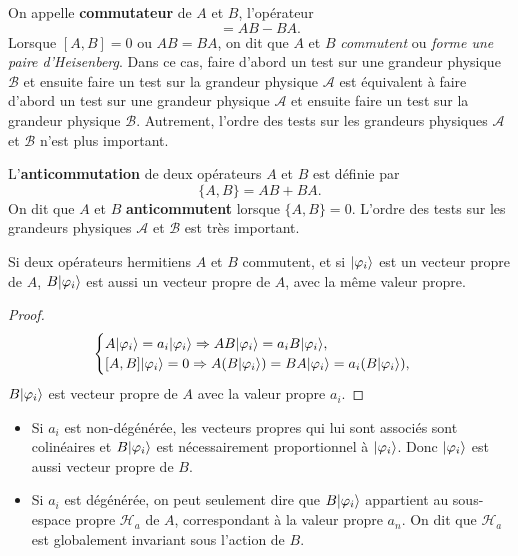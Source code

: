 On appelle \textbf{commutateur }de $A$ et $B$, l'opérateur
\begin{equation}
[A,B]=AB-BA.
\end{equation}
Lorsque $[A,B]=0$ ou $AB=BA$, on dit que $A$ et $B$ \emph{commutent} ou
\emph{forme une paire d'Heisenberg}. Dans ce cas, faire d'abord un test sur une
grandeur physique $\mathcal{B}$ et ensuite faire un test sur la grandeur
physique $\mathcal{A}$ est équivalent à faire d'abord un test sur une grandeur
physique $\mathcal{A}$ et ensuite faire un test sur la grandeur physique
$\mathcal{B}$. Autrement, l'ordre des tests sur les grandeurs physiques
$\mathcal{A}$ et $\mathcal{B}$ n'est plus important.

L'\textbf{anticommutation} de deux opérateurs $A$ et $B$ est définie par%
\begin{equation}
\{A,B\}=AB+BA.
\end{equation}
On dit que $A$ et $B$ \textbf{anticommutent }lorsque $\{A,B\}=0$. L'ordre des
tests sur les grandeurs physiques $\mathcal{A}$ et $\mathcal{B}$ est très
important.

\colorbox[gray]{0.8}{
\parbox[c]{0.9\textwidth}{
\begin{theorem}
\label{th:ABC} Si deux opérateurs hermitiens $A$ et $B$ commutent, et si
$\vert\varphi_{i}\rangle $ est un vecteur propre de $A$, $B\vert\varphi_{i}\rangle$ est
aussi un vecteur propre de $A$, avec la même valeur propre.
\end{theorem}
}}\medskip

\begin{proof}
\begin{equation}
\begin{cases}
A\vert\varphi_{i}\rangle =a_{i}\vert\varphi_{i}\rangle \Rightarrow AB\vert\varphi_{i}\rangle
=a_{i}B\vert\varphi_{i}\rangle,\\
[A,B]\vert\varphi_{i}\rangle =0\Rightarrow
A(B\vert\varphi_{i}\rangle)=BA\vert\varphi_{i}\rangle =a_{i}(B\vert\varphi_{i}\rangle),
\end{cases}
\end{equation}
$B\vert\varphi_{i}\rangle$ est vecteur propre de $A$ avec la valeur propre $a_{i}$.
\end{proof}

\begin{itemize}
\item Si $a_{i}$ est non-dégénérée, les vecteurs propres qui lui sont associés
sont colinéaires et $B\vert\varphi_{i}\rangle $ est nécessairement proportionnel à
$\vert\varphi_{i}\rangle $. Donc $\vert\varphi_{i}\rangle$ est aussi vecteur propre de $B$.

\item Si $a_{i}$ est dégénérée, on peut seulement dire que $B\vert \varphi_{i}\rangle$
appartient au sous-espace propre $\mathcal{H}_{a}$ de $A$, correspondant à la
valeur propre $a_{n}$. On dit que $\mathcal{H}_{a}$ est globalement invariant
sous l'action de $B$.
\end{itemize}

